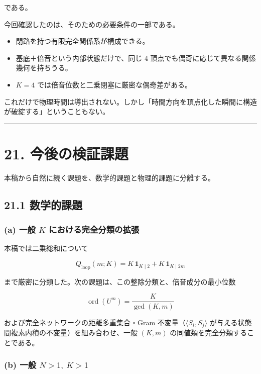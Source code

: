 \documentclass[
  a4paper,
]{ltjsarticle}
\providecommand{\tightlist}{%
  \setlength{\itemsep}{0pt}\setlength{\parskip}{0pt}}
\begin{document}
である。

今回確認したのは、そのための必要条件の一部である。

\begin{itemize}
\tightlist
\item
  閉路を持つ有限完全関係系が構成できる。
\item
  基底＋倍音という内部状態だけで、同じ 4
  頂点でも偶奇に応じて異なる関係幾何を持ちうる。
\item
  \(K=4\) では倍音位数と二乗閉塞に厳密な偶奇差がある。
\end{itemize}

これだけで物理時間は導出されない。しかし「時間方向を頂点化した瞬間に構造が破綻する」ということもない。

\begin{center}\rule{0.5\linewidth}{0.5pt}\end{center}

\section{21.
今後の検証課題}\label{ux4ecaux5f8cux306eux691cux8a3cux8ab2ux984c}

本稿から自然に続く課題を、数学的課題と物理的課題に分離する。

\subsection{21.1 数学的課題}\label{ux6570ux5b66ux7684ux8ab2ux984c}

\subsubsection{\texorpdfstring{(a) 一般 \(K\)
における完全分類の拡張}{(a) 一般 K における完全分類の拡張}}\label{a-ux4e00ux822c-k-ux306bux304aux3051ux308bux5b8cux5168ux5206ux985eux306eux62e1ux5f35}

本稿では二乗総和について

\[
Q_{\mathrm{loop}}(m;K)
=
K\,\mathbf 1_{K\mid2}
+
K\,\mathbf 1_{K\mid2m}
\]

まで厳密に分類した。次の課題は、この整除分類と、倍音成分の最小位数

\[
\operatorname{ord}(U^m)=\frac{K}{\gcd(K,m)}
\]

および完全ネットワークの距離多重集合・Gram
不変量（\(\langle S_i,S_j\rangle\)
が与える状態間複素内積の不変量）を組み合わせ、一般 \((K,m)\)
の同値類を完全分類することである。

\subsubsection{\texorpdfstring{(b) 一般
\(N>1,\ K>1\)}{(b) 一般 N\textgreater1,\textbackslash{} K\textgreater1}}\label{b-ux4e00ux822c-n1-k1}
\end{document}
